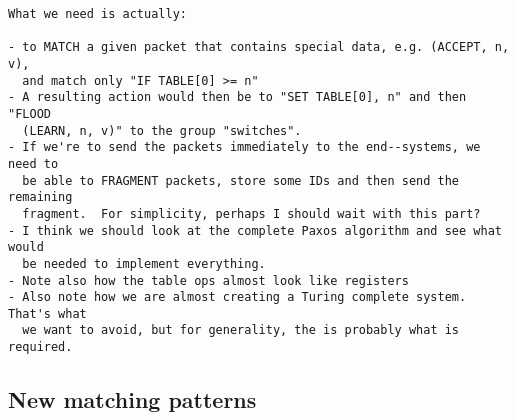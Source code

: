 \begin{verbatim}
What we need is actually:

- to MATCH a given packet that contains special data, e.g. (ACCEPT, n, v),
  and match only "IF TABLE[0] >= n"
- A resulting action would then be to "SET TABLE[0], n" and then "FLOOD
  (LEARN, n, v)" to the group "switches".
- If we're to send the packets immediately to the end--systems, we need to
  be able to FRAGMENT packets, store some IDs and then send the remaining
  fragment.  For simplicity, perhaps I should wait with this part?
- I think we should look at the complete Paxos algorithm and see what would
  be needed to implement everything.
- Note also how the table ops almost look like registers
- Also note how we are almost creating a Turing complete system. That's what
  we want to avoid, but for generality, the is probably what is required.
\end{verbatim}

\subsection{New matching patterns}

